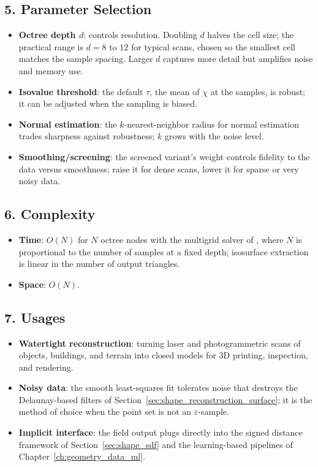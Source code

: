 \subsection{5. Parameter Selection}

\begin{itemize}
  \item \textbf{Octree depth $d$}: controls resolution. Doubling $d$ halves the
    cell size; the practical range is $d = 8$ to $12$ for typical scans, chosen
    so the smallest cell matches the sample spacing. Larger $d$ captures more
    detail but amplifies noise and memory use.
  \item \textbf{Isovalue threshold}: the default $\tau$, the mean of $\chi$ at
    the samples, is robust; it can be adjusted when the sampling is biased.
  \item \textbf{Normal estimation}: the $k$-nearest-neighbor radius for normal
    estimation trades sharpness against robustness; $k$ grows with the noise
    level.
  \item \textbf{Smoothing/screening}: the screened variant's weight controls
    fidelity to the data versus smoothness; raise it for dense scans, lower it
    for sparse or very noisy data.
\end{itemize}

\subsection{6. Complexity}

\begin{itemize}
  \item \textbf{Time}: $O(N)$ for $N$ octree nodes with the multigrid solver of
    \cite{kazhdan2006}, where $N$ is proportional to the number of samples at a
    fixed depth; isosurface extraction is linear in the number of output
    triangles.
  \item \textbf{Space}: $O(N)$.
\end{itemize}

\subsection{7. Usages}

\begin{itemize}
  \item \textbf{Watertight reconstruction}: turning laser and photogrammetric
    scans of objects, buildings, and terrain into closed models for 3D
    printing, inspection, and rendering.
  \item \textbf{Noisy data}: the smooth least-squares fit tolerates noise that
    destroys the Delaunay-based filters of
    Section~\ref{sec:shape_reconstruction_surface}; it is the method of choice
    when the point set is not an $\varepsilon$-sample.
  \item \textbf{Implicit interface}: the field output plugs directly into the
    signed distance framework of Section~\ref{sec:shape_sdf} and the
    learning-based pipelines of Chapter~\ref{ch:geometry_data_ml}.
\end{itemize}

